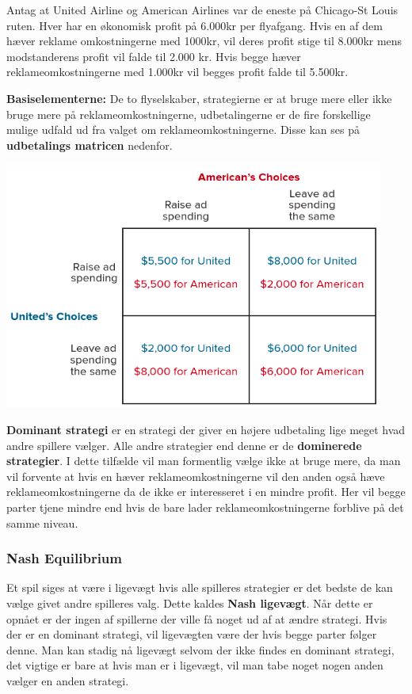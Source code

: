 \begin{eks} \textbf{} %
\newline
Antag at United Airline og American Airlines var de eneste på Chicago-St Louis ruten. Hver har en økonomisk profit på 6.000kr per flyafgang. Hvis en af dem hæver reklame omkostningerne med 1000kr, vil deres profit stige til 8.000kr mens modstanderens profit vil falde til 2.000 kr. Hvis begge hæver reklameomkostningerne med 1.000kr vil begges profit falde til 5.500kr. 

\textbf{Basiselementerne:} De to flyselskaber, strategierne er at bruge mere eller ikke bruge mere på reklameomkostningerne, udbetalingerne er de fire forskellige mulige udfald ud fra valget om reklameomkostningerne. Disse kan ses på \textbf{udbetalings matricen} nedenfor.

\includegraphics[scale=0.4]{Afsnit/Lektion5/udbetalingsmatrice.png}

\textbf{Dominant strategi} er en strategi der giver en højere udbetaling lige meget hvad andre spillere vælger. Alle andre strategier end denne er de \textbf{dominerede strategier}. I dette tilfælde vil man formentlig vælge ikke at bruge mere, da man vil forvente at hvis en hæver reklameomkostningerne vil den anden også hæve reklameomkostningerne da de ikke er interesseret i en mindre profit. Her vil begge parter tjene mindre end hvis de bare lader reklameomkostningerne forblive på det samme niveau. \end{eks}

\subsubsection{Nash Equilibrium}
Et spil siges at være i ligevægt hvis alle spilleres strategier er det bedste de kan vælge givet andre spilleres valg. Dette kaldes \textbf{Nash ligevægt}. Når dette er opnået er der ingen af spillerne der ville få noget ud af at ændre strategi. Hvis der er en dominant strategi, vil ligevægten være der hvis begge parter følger denne. Man kan stadig nå ligevægt selvom der ikke findes en dominant strategi, det vigtige er bare at hvis man er i ligevægt, vil man tabe noget nogen anden vælger en anden strategi. 

